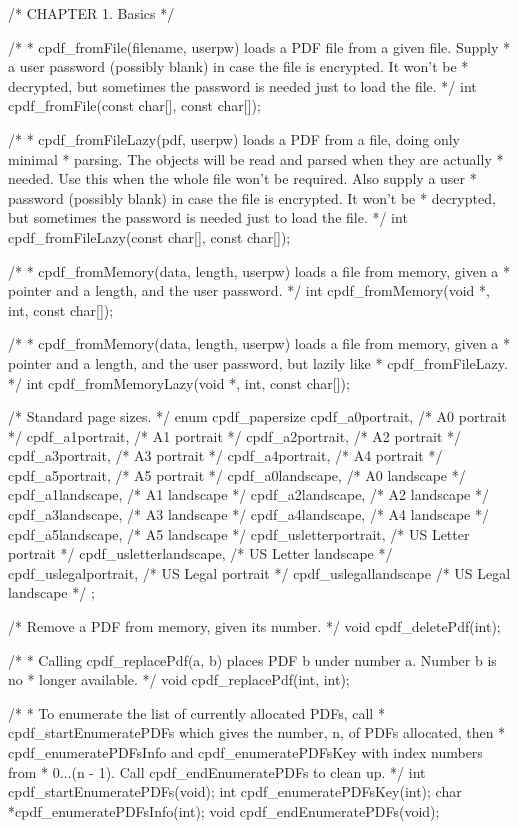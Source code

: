 /* CHAPTER 1. Basics */

/*
 * cpdf_fromFile(filename, userpw) loads a PDF file from a given file. Supply
 * a user password (possibly blank) in case the file is encrypted. It won't be
 * decrypted, but sometimes the password is needed just to load the file.
 */
int cpdf_fromFile(const char[], const char[]);

/*
 * cpdf_fromFileLazy(pdf, userpw) loads a PDF from a file, doing only minimal
 * parsing. The objects will be read and parsed when they are actually
 * needed. Use this when the whole file won't be required. Also supply a user
 * password (possibly blank) in case the file is encrypted. It won't be
 * decrypted, but sometimes the password is needed just to load the file.
 */
int cpdf_fromFileLazy(const char[], const char[]);

/*
 * cpdf_fromMemory(data, length, userpw) loads a file from memory, given a
 * pointer and a length, and the user password.
 */
int cpdf_fromMemory(void *, int, const char[]);

/*
 * cpdf_fromMemory(data, length, userpw) loads a file from memory, given a
 * pointer and a length, and the user password, but lazily like
 * cpdf_fromFileLazy.
 */
int cpdf_fromMemoryLazy(void *, int, const char[]);

/* Standard page sizes. */
enum cpdf_papersize {
  cpdf_a0portrait,        /* A0 portrait */
  cpdf_a1portrait,        /* A1 portrait */
  cpdf_a2portrait,        /* A2 portrait */
  cpdf_a3portrait,        /* A3 portrait */
  cpdf_a4portrait,        /* A4 portrait */
  cpdf_a5portrait,        /* A5 portrait */
  cpdf_a0landscape,       /* A0 landscape */
  cpdf_a1landscape,       /* A1 landscape */
  cpdf_a2landscape,       /* A2 landscape */
  cpdf_a3landscape,       /* A3 landscape */
  cpdf_a4landscape,       /* A4 landscape */
  cpdf_a5landscape,       /* A5 landscape */
  cpdf_usletterportrait,  /* US Letter portrait */
  cpdf_usletterlandscape, /* US Letter landscape */
  cpdf_uslegalportrait,   /* US Legal portrait */
  cpdf_uslegallandscape   /* US Legal landscape */
};

/* Remove a PDF from memory, given its number. */
void cpdf_deletePdf(int);

/*
 * Calling cpdf_replacePdf(a, b) places PDF b under number a. Number b is no
 * longer available.
 */
void cpdf_replacePdf(int, int);

/*
 * To enumerate the list of currently allocated PDFs, call
 * cpdf_startEnumeratePDFs which gives the number, n, of PDFs allocated, then
 * cpdf_enumeratePDFsInfo and cpdf_enumeratePDFsKey with index numbers from
 * 0...(n - 1). Call cpdf_endEnumeratePDFs to clean up.
 */
int cpdf_startEnumeratePDFs(void);
int cpdf_enumeratePDFsKey(int);
char *cpdf_enumeratePDFsInfo(int);
void cpdf_endEnumeratePDFs(void);

